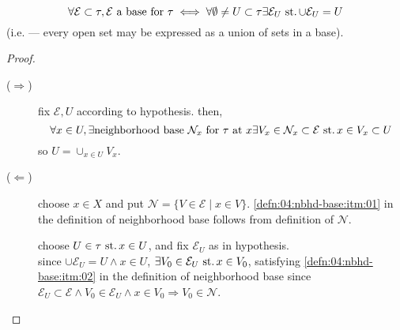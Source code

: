 
\begin{prop}\label{prop:4.2}\label{prop:04:base-char}
  \[
  \forall\mathcal{E}\subset\tau,
  \mathcal{E}\text{ a base for }\tau\iff
  \forall \emptyset\neq U\subset\tau\exists\mathcal{E}_U\operatorname{\,st.}
  \cup \mathcal{E}_U = U
  \]
  (i.e. --- every open set may be expressed as a union of
  sets in a base).
\end{prop}
\begin{proof}\ 
  \begin{description}
  \item[($\Rightarrow$)] fix ${\mathcal{E}, U}$ according to hypothesis.
    then,
    \[
    \forall x\in U,
    \exists\text{neighborhood base }\mathcal{N}_x
    \text{ for }\tau\text{ at } x
    \exists V_x\in\mathcal{N}_x\subset\mathcal{E}\operatorname{\,st.}
    x\in V_x\subset U
    \]
    so ${U=\cup_{x\in U} V_x}$.
  \item[($\Leftarrow$)]
    choose ${x\in X}$ and put
    ${\mathcal{N} = \{V\in\mathcal{E}\mid x\in V\}}$.
    \ref{defn:04:nbhd-base:itm:01} in the definition of
    neighborhood base follows from definition of $\mathcal{N}$.

    choose ${U\in\tau\operatorname{\,st.} x\in U}$, and fix ${\mathcal{E}_U}$
    as in hypothesis.\\
    since ${\cup \mathcal{E}_U=U\land x\in U}$,
    ${\exists V_0\in\mathcal{E}_U\operatorname{\,st.} x\in V_0}$,
    satisfying \ref{defn:04:nbhd-base:itm:02} in the definition of
    neighborhood base since
    ${\mathcal{E}_U\subset\mathcal{E}\land V_0\in\mathcal{E}_U\land x\in V_0\Rightarrow V_0\in\mathcal{N}}$.
  \end{description}
\end{proof}

